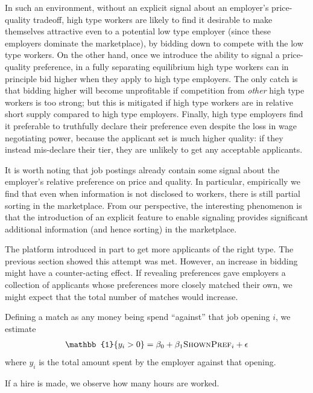 In such an environment, without an explicit signal about an employer's price-quality tradeoff, high type workers are likely to find it desirable to make themselves attractive even to a potential low type employer (since these employers dominate the marketplace), by bidding down to compete with the low type workers.
On the other hand, once we introduce the ability to signal a price-quality preference, in a fully separating equilibrium high type workers can in principle bid higher when they apply to high type employers.
The only catch is that bidding higher will become unprofitable if competition from {\em other} high type workers is too strong;
but this is mitigated if high type workers are in relative short supply compared to high type employers.
Finally, high type employers find it preferable to truthfully declare their preference even despite the loss in wage negotiating power, because the applicant set is much higher quality:
if they instead mis-declare their tier, they are unlikely to get any acceptable applicants.



It is worth noting that job postings already contain some signal about the employer's relative preference on price and quality.  
In particular, empirically we find that even when information is not disclosed to workers, there is still partial sorting in the marketplace.  
From our perspective, the interesting phenomenon is that the introduction of an explicit feature to enable signaling provides significant additional information (and hence sorting) in the marketplace.



The platform introduced \hottowel{} in part to get more applicants of the right type.
The previous section showed this attempt was met. 
However, an increase in bidding might have a counter-acting effect. 
If revealing preferences gave employers a collection of applicants whose preferences more closely matched their own, we might expect that the total number of matches would increase.

Defining a match as any money being spend ``against'' that job opening $i$, we estimate 
\begin{align} \label{eq:fill}
\mathbb{1}\{y_i > 0\} = \beta_0 + \beta_1 \textsc{ShownPref}_i + \epsilon 
\end{align} 
where $y_i$ is the total amount spent by the employer against that opening.


If a hire is made, we observe how many hours are worked. 

